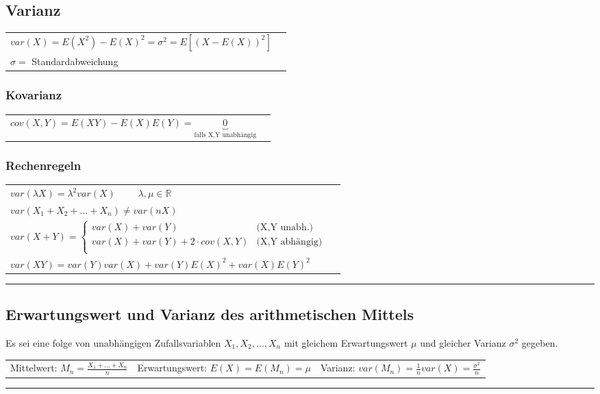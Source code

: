 \begin{minipage}{9cm}
\subsection{Varianz }
  \begin{tabular}{ll}
    $\boxed{var(X)=E(X^2)-E(X)^2}=\sigma ^2=E[(X-E(X))^2]$\\
    $\sigma = $ Standardabweichung\\
	\end{tabular}
	\subsubsection{Kovarianz}
	\begin{tabular}{ll}
	  $cov(X,Y)=E(XY)-E(X)E(Y)=\underbrace{0}_{\text{falls X,Y unabhängig}}$
	\end{tabular}
\end{minipage}
\begin{minipage}{9cm}
  \subsubsection{Rechenregeln}
  \begin{tabular}{ll}
    $var(\lambda X)=\lambda^2 var(X) \qquad $ $\lambda, \mu
    \in \mathbb{R}$\\
    $var(X_1+X_2+\ldots+X_n) \neq var(n X)$ \\
    $var(X+Y)= \begin{cases}
      var(X)+var(Y)                      &	\text{(X,Y unabh.)}\\                     
      var(X) + var(Y) + 2 \cdot cov(X,Y) &	\text{(X,Y abhängig)}\\
    \end{cases} $ \\
    $var(X Y)= var(Y)var(X)+var(Y)E(X)^2+var(X)E(Y)^2$
  \end{tabular}
\end{minipage}
\vspace{1mm}
\hrule

\subsection{Erwartungswert und Varianz des arithmetischen Mittels }
Es sei eine folge von unabhängigen Zufallsvariablen $X_1, X_2, \ldots , X_n$ mit
gleichem Erwartungswert $ \mu $ und gleicher Varianz $ \sigma^2 $ gegeben. \\
\begin{tabular}{p{6cm} p{6cm} p{6cm}}
  Mittelwert: $M_n=\frac{X_1+\ldots+X_n}{n}$ &
  Erwartungswert: $E(X)=E(M_n) = \mu$  &
  Varianz: $var(M_n)=\frac{1}{n}var(X) = \frac{\sigma ^2}{n} $
\end{tabular}
\vspace{1mm}
\hrule

